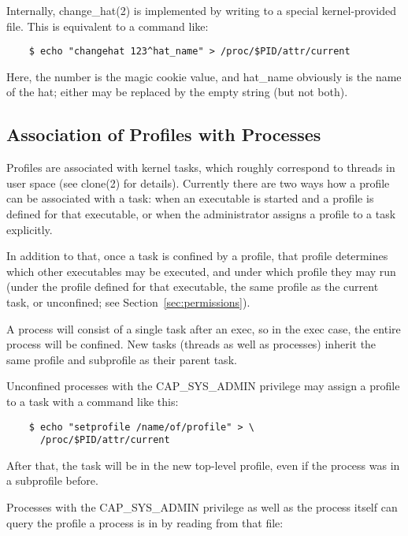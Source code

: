 \documentclass[a4paper]{article}
\renewcommand{\H}{\hspace{0pt}}
\begin{document}
Internally, change\_hat(2) is implemented by writing to a special
kernel-provided file.  This is equivalent to a command like:

\begin{small}
\begin{verbatim}
    $ echo "changehat 123^hat_name" > /proc/$PID/attr/current
\end{verbatim}
\end{small}

Here, the number is the magic cookie value, and hat\_name obviously is
the name of the hat; either may be replaced by the empty string (but not
both).


\subsection{Association of Profiles with Processes}
\label{sec:association}

Profiles are associated with kernel tasks, which roughly correspond to
threads in user space (see clone(2) for details).  Currently there are
two ways how a profile can be associated with a task: when an executable
is started and a profile is defined for that executable, or when the
administrator assigns a profile to a task explicitly.

In addition to that, once a task is confined by a profile, that profile
determines which other executables may be executed, and under which
profile they may run (under the profile defined for that executable, the
same profile as the current task, or unconfined; see
Section~\ref{sec:permissions}).

A process will consist of a single task after an exec, so in the exec
case, the entire process will be confined.  New tasks (threads as well
as processes) inherit the same profile and subprofile as their parent
task.

Unconfined processes with the CAP\_{\H}SYS\_{\H}ADMIN privilege may assign a
profile to a task with a command like this:

\begin{small}
\begin{verbatim}
    $ echo "setprofile /name/of/profile" > \
      /proc/$PID/attr/current
\end{verbatim}
\end{small}

After that, the task will be in the new top-level profile, even if the
process was in a subprofile before.

Processes with the CAP\_{\H}SYS\_{\H}ADMIN privilege as well as the process itself
can query the profile a process is in by reading from that file:
\end{document}
